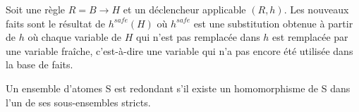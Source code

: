 \begin{definition}\label{def:application_declencheur}
Soit une règle $R = B \rightarrow H$ et un déclencheur applicable $(R,h)$. Les nouveaux faits sont le résultat de $h^{safe}(H)$ où $h^{safe}$ est une substitution obtenue à partir de $h$ où chaque variable de $H$ qui n'est pas remplacée dans $h$ est remplacée par une variable fraîche, c'est-à-dire une variable qui n'a pas encore été utilisée dans la base de faits.
\end{definition}








\begin{definition}
Un ensemble d'atomes S est redondant s'il existe un homomorphisme de S dans l'un de ses sous-ensembles stricts.
\end{definition}

